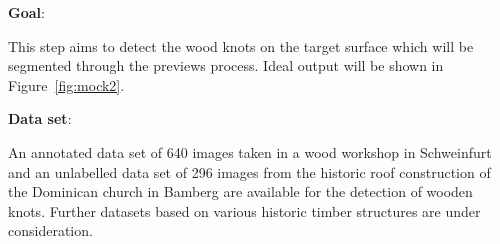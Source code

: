 \renewcommand\thesection{\arabic{section}}
\renewcommand\thesubsection{\thesection.\arabic{subsection}}



\textbf{Goal}:

This step aims to detect the wood knots on the target surface which will be segmented through the previews process. Ideal output will be shown in Figure~\ref{fig:mock2}.

\hspace*{\fill}

\textbf{Data set}:

An annotated data set of 640 images taken in a wood workshop in Schweinfurt and an unlabelled data set of 296 images from the historic roof construction of the Dominican church in Bamberg are available for the detection of wooden knots. Further datasets based on various historic timber structures are under consideration.

\hspace*{\fill}

